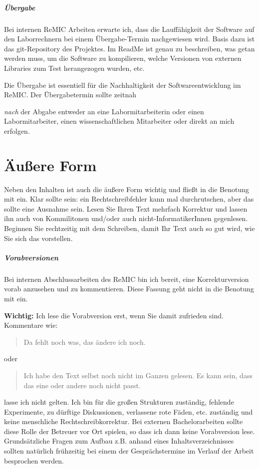 \paragraph{Übergabe} Bei internen ReMIC Arbeiten erwarte ich, dass die Lauffähigkeit der Software auf den Laborrechnern bei einem Übergabe-Termin nachgewiesen wird.
Basis dazu ist das git-Repository des Projektes.
Im ReadMe ist  genau zu beschreiben, was getan werden muss, um die Software zu kompilieren, welche Versionen von externen Libraries zum Test herangezogen wurden, etc.

Die Übergabe ist essentiell für die Nachhaltigkeit der Softwareentwicklung im ReMIC.
Der Übergabetermin sollte zeitnah {\emph{nach} der Abgabe entweder an eine Labormitarbeiterin oder einen Labormitarbeiter, einen wissenschaftlichen Mitarbeiter oder direkt an mich erfolgen.

\chapter{Äußere Form}
\label{form}

Neben den Inhalten ist auch die äußere Form wichtig und fließt in die Benotung mit ein.
Klar sollte sein: ein Rechtschreibfehler kann mal durchrutschen, aber das sollte eine Ausnahme sein.
Lesen Sie Ihren Text mehrfach Korrektur und lassen ihn auch von Kommilitonen und/oder auch nicht-InformatikerInnen gegenlesen.
Beginnen Sie rechtzeitig mit dem Schreiben, damit Ihr Text auch so gut wird, wie Sie sich das vorstellen.

\paragraph{Vorabversionen}
Bei internen Abschlussarbeiten des ReMIC bin ich bereit, eine Korrekturversion vorab anzusehen und zu kommentieren.
Diese Fassung geht nicht in die Benotung mit ein.

\textbf{Wichtig:} Ich lese die Vorabversion erst, wenn Sie damit zufrieden sind. Kommentare wie:
\begin{quote}
\glqq Da fehlt noch was, das ändere ich noch.\grqq
\end{quote}
oder
\begin{quote}
\glqq Ich habe den Text selbst noch nicht im Ganzen gelesen. Es kann sein, dass das eine oder andere noch nicht passt.\glqq
\end{quote}
lasse ich nicht gelten. Ich bin für die großen Strukturen zuständig, fehlende Experimente, zu dürftige Diskussionen, verlassene rote Fäden, etc. zuständig und keine menschliche Rechtschreibkorrektur.
Bei externen Bachelorarbeiten sollte diese Rolle der Betreuer vor Ort spielen, so dass ich dann keine Vorabversion lese.
Grundsätzliche Fragen zum Aufbau z.B. anhand eines Inhaltsverzeichnisses sollten natürlich frühzeitig bei einem der Gesprächstermine im Verlauf der Arbeit besprochen werden.

}
